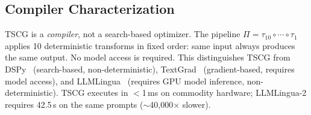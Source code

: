\subsection{Compiler Characterization}

TSCG is a \emph{compiler}, not a search-based optimizer.
The pipeline $\Pi = \tau_{10} \circ \cdots \circ \tau_1$ applies 10 deterministic transforms in fixed order: same input always produces the same output.
No model access is required.
This distinguishes TSCG from DSPy~\cite{khattab2023dspy} (search-based, non-deterministic), TextGrad~\cite{yuksekgonul2024textgrad} (gradient-based, requires model access), and LLMLingua~\cite{pan2024llmlingua2} (requires GPU model inference, non-deterministic).
TSCG executes in ${<}$1\,ms on commodity hardware; LLMLingua-2 requires 42.5\,s on the same prompts (${\sim}$40{,}000$\times$ slower).
